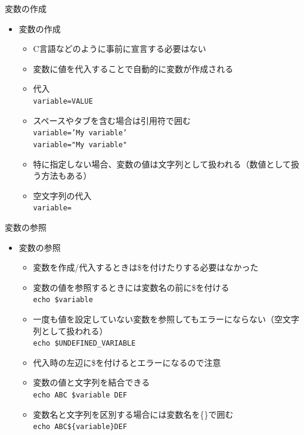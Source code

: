\documentclass[12pt,aspectratio=169]{beamer}
\begin{document}
\begin{frame}{変数の作成}
  \begin{itemize}
    \item 変数の作成
      \begin{itemize}
        \item C言語などのように事前に宣言する必要はない
        \item 変数に値を代入することで自動的に変数が作成される
        \item 代入 \\
              \texttt{variable=VALUE}
        \item スペースやタブを含む場合は引用符で囲む \\
              \texttt{variable='My variable'} \\
              \texttt{variable="My variable"}
        \item 特に指定しない場合、変数の値は文字列として扱われる（数値として扱う方法もある）
        \item 空文字列の代入 \\
              \texttt{variable=}
      \end{itemize}

  \end{itemize}

\end{frame}


\begin{frame}{変数の参照}
  \begin{itemize}
    \item 変数の参照
      \begin{itemize}
        \item 変数を作成/代入するときは\$を付けたりする必要はなかった
        \item 変数の値を参照するときには変数名の前に\$を付ける \\
              \texttt{echo \$variable}
        \item 一度も値を設定していない変数を参照してもエラーにならない（空文字列として扱われる） \\
              \texttt{echo \$UNDEFINED\_VARIABLE}
        \item 代入時の左辺に\$を付けるとエラーになるので注意
        \item 変数の値と文字列を結合できる \\
              \texttt{echo ABC \$variable DEF}
        \item 変数名と文字列を区別する場合には変数名を\{\}で囲む \\
              \texttt{echo ABC\$\{variable\}DEF}
      \end{itemize}

  \end{itemize}

\end{frame}
\end{document}
